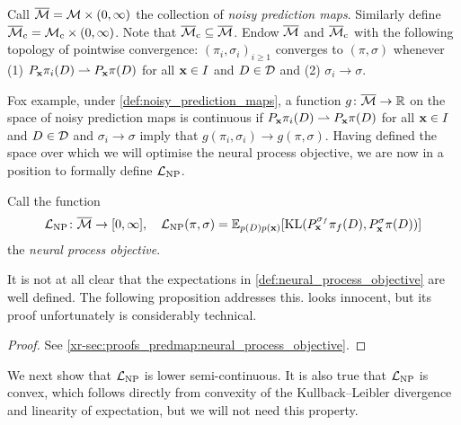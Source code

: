\documentclass[12pt, twoside]{report}
\newcommand{\xrprefix}[1]{xr-#1}
\begin{document}
\begin{definition} \label{def:noisy_prediction_maps}
    Call $\overline{\mathcal{M}} = \mathcal{M} \times (0, \infty)$ the collection of \emph{noisy prediction maps}.
    Similarly define $\overline{\M}\ss{c} = \M\ss{c} \times (0, \infty)$.
    Note that $\overline{\M}\ss{c} \sub \overline{\M}$.
    Endow $\overline{\mathcal{M}}$ and $\overline{\M}\ss{c}$ with the following topology of pointwise convergence:
    $(\pi_i, \sigma_i)_{i \ge 1}$ converges to $(\pi, \sigma)$ whenever
    (1) $P_{\mathbf{x}} \pi_i(D)\rightharpoonup P_{\mathbf{x}}\pi(D)$ for all $\mathbf{x} \in I$ and $D \in \mathcal{D}$ and
    (2) $\sigma_i\to \sigma$.
\end{definition}

Fox example, under \cref{def:noisy_prediction_maps}, a function $g \colon \overline{\mathcal{M}} \to \mathbb{R}$ on the space of noisy prediction maps is continuous if $P_{\mathbf{x}} \pi_i(D) \rightharpoonup P_{\mathbf{x}}\pi(D)$ for all $\mathbf{x} \in I$ and $D \in \mathcal{D}$ and $\sigma_i \to \sigma$ imply that $g(\pi_i, \sigma_i) \to g(\pi, \sigma)$.
Having defined the space over which we will optimise the neural process objective,
we are now in a position to formally define $\L\ss{NP}$.

\begin{definition} \label{def:neural_process_objective}
    Call the function
    \begin{equation}
        \L\ss{NP}\colon\overline{\M} \to [0, \infty], \quad \L\ss{NP}(\pi, \sigma)
        = \E_{p(D)p(\vx)}[\KL(P_\vx^{\sigma_f} \pi_f(D), P_\vx^{\sigma} \pi(D))]
    \end{equation}
    the \emph{neural process objective}.
\end{definition}

It is not at all clear that the expectations in \cref{def:neural_process_objective} are well defined.
The following proposition addresses this.
 looks innocent, but its proof unfortunately is considerably technical.

\begin{proof}
    See \cref{\xrprefix{sec:proofs_predmap:neural_process_objective}}.
\end{proof}

We next show that $\L\ss{NP}$ is lower semi-continuous.
It is also true that $\L\ss{NP}$ is convex, which follows directly from convexity of the Kullback--Leibler divergence \parencite[Lemma 7.2;][]{Gray:2011:Entropy_and_Information_Theory} and linearity of expectation, but we will not need this property.
\end{document}
